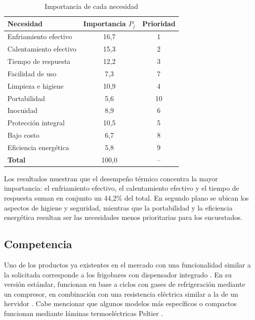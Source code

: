 \documentclass[12pt, a4paper]{article}
\begin{document}
\begin{table}[H]
    \centering
    \begin{tabular}{lcc}
        \toprule
        \textbf{Necesidad} & \textbf{Importancia} $P_j$ & \textbf{Prioridad} \\
        \midrule
        Enfriamiento efectivo  & 16,7 & 1 \\
        Calentamiento efectivo & 15,3 & 2 \\
        Tiempo de respuesta    & 12,2 & 3 \\
        Facilidad de uso       & 7,3  & 7 \\
        Limpieza e higiene     & 10,9 & 4 \\
        Portabilidad           & 5,6  & 10 \\
        Inocuidad              & 8,9  & 6 \\
        Protección integral    & 10,5 & 5 \\
        Bajo costo             & 6,7  & 8 \\
        Eficiencia energética  & 5,8  & 9 \\
        \midrule
        \textbf{Total}         & 100,0 & -- \\
        \bottomrule
    \end{tabular}
    \caption{Importancia de cada necesidad}
    \label{tab:necesidades}
\end{table}

Los resultados muestran que el desempeño térmico concentra la mayor importancia: el enfriamiento efectivo, el calentamiento efectivo y el tiempo de respuesta suman en conjunto un 44,2\% del total. En segundo plano se ubican los aspectos de higiene y seguridad, mientras que la portabilidad y la eficiencia energética resultan ser las necesidades menos prioritarias para los encuestados.

\subsection{Competencia}
Uno de los productos ya existentes en el mercado con una funcionalidad similar a la solicitada corresponde a los frigobares con dispensador integrado \parencite{mercadolibre_frigobar}. En su versión estándar, funcionan en base a ciclos con gases de refrigeración mediante un compresor, en combinación con una resistencia eléctrica similar a la de un hervidor \parencite{culligan2024}. Cabe mencionar que algunos modelos más específicos o compactos funcionan mediante láminas termoeléctricas Peltier \parencite{falabella_dispensador}.
\end{document}
